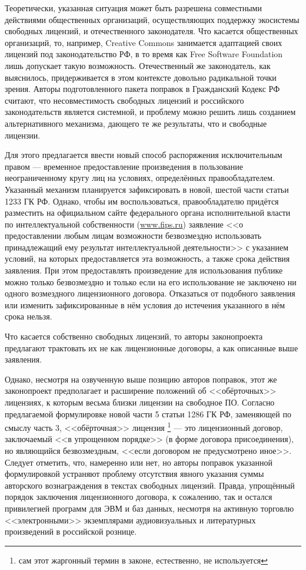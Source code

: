 \documentclass[10pt, a5paper]{article}
\begin{document}
Теоретически, указанная ситуация может быть разрешена совместными действиями общественных организаций, осуществляющих поддержку экосистемы свободных лицензий, и отечественного законодателя. Что касается общественных организаций, то, например, Creative Commons занимается адаптацией своих лицензий под законодательство РФ, в то время как Free Software Foundation лишь допускает такую возможность. Отечественный же законодатель, как выяснилось, придерживается в этом контексте довольно радикальной точки зрения. Авторы подготовленного пакета поправок в Гражданский Кодекс РФ считают, что несовместимость свободных лицензий и российского законодательств является системной, и проблему можно решить лишь созданием альтернативного механизма, дающего те же результаты, что и свободные лицензии.

Для этого предлагается ввести новый способ распоряжения исключительным правом --- временное предоставление произведения в пользование неограниченному кругу лиц на условиях, определённых правообладателем. Указанный механизм планируется зафиксировать в новой, шестой части статьи 1233 ГК РФ. Однако, чтобы им воспользоваться, правообладателю придётся разместить на официальном сайте федерального органа исполнительной власти по интеллектуальной собственности (\url{www.fips.ru}) заявление <<о предоставлении любым лицам возможности безвозмездно использовать принадлежащий ему результат интеллектуальной деятельности>> с указанием условий, на которых предоставляется эта возможность, а также срока действия заявления. При этом предоставлять произведение для использования публике можно только безвозмездно и только если на его использование не заключено ни одного возмездного лицензионного договора. Отказаться от подобного заявления или изменить зафиксированные в нём условия до истечения указанного в нём срока нельзя. 

Что касается собственно свободных лицензий, то авторы законопроекта предлагают трактовать их не как лицензионные договоры, а как описанные выше заявления. 

Однако, несмотря на озвученную выше позицию авторов поправок, этот же законопроект предполагает и расширение  положений об <<обёрточных>> лицензиях, к которым весьма близки лицензии на свободное ПО. Согласно предлагаемой формулировке новой части 5 статьи 1286 ГК РФ, заменяющей по смыслу часть 3, <<обёрточная>> лицензия \footnote{сам этот жаргонный термин в законе, естественно, не используется} --- это лицензионный договор, заключаемый <<в упрощенном порядке>> (в форме договора присоединения), но являющийся безвозмездным, <<если договором не предусмотрено иное>>. Следует отметить, что, намеренно или нет, но авторы поправок указанной формулировкой устраняют проблему отсутствия явного указания суммы авторского вознаграждения в текстах свободных лицензий. Правда, упрощённый порядок заключения лицензионного договора, к сожалению, так и остался привилегией программ для ЭВМ и баз данных, несмотря на активную торговлю <<электронными>> экземплярами  аудиовизуальных и литературных произведений в российской рознице.
\end{document}
